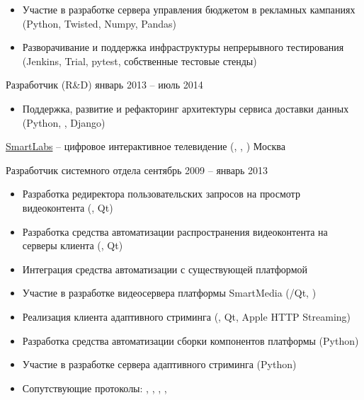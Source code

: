 \documentclass[unicode, 10pt, a4paper, oneside, fleqn]{article}
\begin{document}
{{\begin{itemize}
{                          Scipy, Pandas)}
                    \item{Участие в разработке сервера управления бюджетом в
                          рекламных кампаниях (Python, Twisted, Numpy, Pandas)}
                    \item{Разворачивание и поддержка инфраструктуры непрерывного
                          тестирования (Jenkins, Trial, pytest, собственные тестовые стенды)}
                \end{itemize}
            }
        \position  %
            {Разработчик (R\&D)}
            {январь 2013 -- июль 2014}
            {
                \begin{itemize}
                    \item{Поддержка, развитие и рефакторинг архитектуры сервиса
                          доставки данных (Python, , Django)}
                \end{itemize}
            }
    }


\job  %
    {\href{http://www.smartlabs.tv}{SmartLabs} -- цифровое
     интерактивное телевидение (, , )}
    {Москва}
    {
        \position  %
            {Разработчик системного отдела}
            {сентябрь 2009 -- январь 2013}
            {
                \begin{itemize}
                    \item{Разработка редиректора пользовательских запросов на
                          просмотр видеоконтента (\CPP, Qt)}
                    \item{Разработка средства автоматизации распространения
                          видеоконтента на серверы клиента (\CPP, Qt)}
                    \item{Интеграция средства автоматизации с существующей платформой}
                    \item{Участие в разработке видеосервера платформы SmartMedia
                          (\CPP/Qt, )}
                    \item{Реализация клиента адаптивного стриминга (\CPP, Qt, Apple HTTP Streaming)}
                    \item{Разработка средства автоматизации сборки компонентов платформы
                          (Python)}
                    \item{Участие в разработке сервера адаптивного стриминга (Python)}
                    \item{Сопутствующие протоколы: , , ,
                          , }
                \end{itemize}
            }
    }
\end{document}
